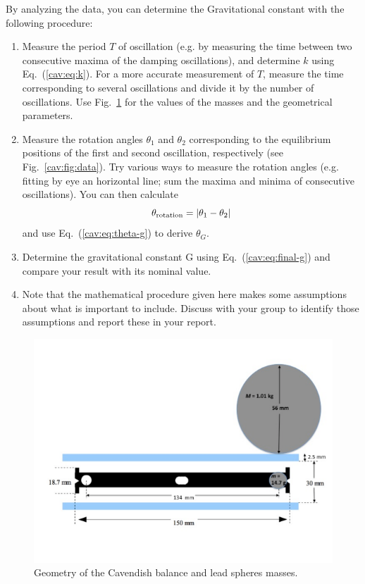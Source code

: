 By analyzing the data, you can determine the Gravitational constant with the following
procedure:
\begin{enumerate}
	\item Measure the period $T$ of oscillation (e.g. by measuring the time between two
	consecutive maxima of the damping oscillations), and determine $k$ using Eq.~(\ref{cav:eq:k}). For a more
	accurate measurement of $T$, measure the time corresponding to several
	oscillations and divide it by the number of oscillations. Use Fig.~\ref{cav:fig:geo} for the values
	of the masses and the geometrical parameters.
	
	\item Measure the rotation angles $\theta_1$ and $\theta_2$ corresponding to the equilibrium positions
	of the first and second oscillation, respectively (see Fig.~\ref{cav:fig:data}). Try various ways to measure the rotation angles (e.g. fitting by eye an horizontal line; sum the
	maxima and minima of consecutive oscillations). You can then calculate
	\begin{equation}
	\theta_\textrm{rotation} = \left\lvert\theta_1 - \theta_2\right\rvert
	\end{equation}
	and use Eq.~(\ref{cav:eq:theta-g}) to derive $\theta_G$.
	
	\item Determine the gravitational constant G using Eq.~(\ref{cav:eq:final-g}) and compare your result with its nominal value.
	
	\item Note that the mathematical procedure given here makes some assumptions about what is important to include. Discuss with your group to identify those assumptions and report these in your report.
\end{enumerate}

\begin{figure}
	\centering
	\includegraphics[width=\textwidth]{cavendish/tel-rp2111-geometry}
	\caption{Geometry of the Cavendish balance and lead spheres masses.}\label{cav:fig:geo}
\end{figure}

